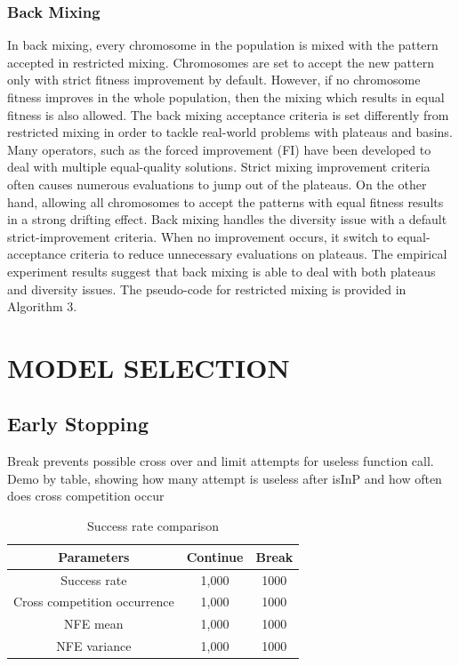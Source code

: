 \documentclass{sig-alternate-05-2015}
\begin{document}
\subsubsection{Back Mixing}
In back mixing, every chromosome in the population is mixed with the pattern accepted in restricted mixing. Chromosomes are set to accept the new pattern only with strict fitness improvement by default. However, if no chromosome fitness improves in the whole population, then the mixing which results in equal fitness is also allowed. The back mixing acceptance criteria is set differently from restricted mixing in order to tackle real-world problems with plateaus and basins. Many operators, such as the forced improvement (FI) \cite{bosman:LT-GOMEA} have been developed to deal with multiple equal-quality solutions. Strict mixing improvement criteria often causes numerous evaluations to jump out of the plateaus. On the other hand, allowing all chromosomes to accept the patterns with equal fitness results in a strong drifting effect. Back mixing handles the diversity issue with a default strict-improvement criteria. When no improvement occurs, it switch to equal-acceptance criteria to reduce unnecessary evaluations on plateaus. The empirical experiment results suggest that back mixing is able to deal with both plateaus and diversity issues. The pseudo-code for  restricted mixing is provided in Algorithm 3.




\section{MODEL SELECTION}

\subsection{Early Stopping}
Break prevents possible cross over and limit attempts for useless function call. 
Demo by table, showing how many attempt is useless after isInP and how often does cross competition occur

\begin{table}[ht]
\centering
\begin{tabular}{ |c|c|c| } \hline
Parameters & Continue & Break \\ \hline
Success rate 					& 1,000& 1000\\ \hline
Cross competition occurrence	& 1,000& 1000\\ \hline
NFE mean				 		& 1,000& 1000\\ \hline
NFE variance					& 1,000& 1000\\ \hline
\end{tabular}
\caption{Success rate comparison}
\end{table}
\end{document}
